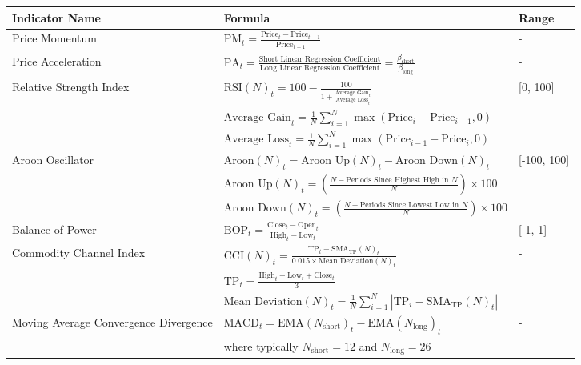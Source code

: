 \begin{table}[htb!]
\centering
\footnotesize
\begin{tabularx}{\textwidth}{@{}lXl@{}}
\toprule
\textbf{Indicator Name} & \textbf{Formula} & \textbf{Range} \\ 
\midrule
Price Momentum & $\text{PM}_t = \frac{\text{Price}_t - \text{Price}_{t-1}}{\text{Price}_{t-1}}$ & - \\
\addlinespace
Price Acceleration & $\text{PA}_t = \frac{\text{Short Linear Regression Coefficient}}{\text{Long Linear Regression Coefficient}} = \frac{\beta_\text{short}}{\beta_\text{long}}$ & - \\
\addlinespace
Relative Strength Index & $\text{RSI}(N)_t = 100 - \frac{100}{1 + \frac{\text{Average Gain}_t}{\text{Average Loss}_t}}$ & [0, 100] \\
\addlinespace
& $\text{Average Gain}_t = \frac{1}{N}\sum_{i=1}^{N} \max(\text{Price}_i - \text{Price}_{i-1}, 0)$ & \\
\addlinespace
& $\text{Average Loss}_t = \frac{1}{N}\sum_{i=1}^{N} \max(\text{Price}_{i-1} - \text{Price}_i, 0)$ & \\
\addlinespace
Aroon Oscillator & $\text{Aroon}(N)_t = \text{Aroon Up}(N)_t - \text{Aroon Down}(N)_t$ & [-100, 100] \\
\addlinespace
& $\text{Aroon Up}(N)_t = \left( \frac{N - \text{Periods Since Highest High in } N}{N} \right) \times 100$ & \\
\addlinespace
& $\text{Aroon Down}(N)_t = \left( \frac{N - \text{Periods Since Lowest Low in } N}{N} \right) \times 100$ & \\
\addlinespace
Balance of Power & $\text{BOP}_t = \frac{\text{Close}_t - \text{Open}_t}{\text{High}_t - \text{Low}_t}$ & [-1, 1] \\
\addlinespace
Commodity Channel Index & $\text{CCI}(N)_t = \frac{\text{TP}_t - \text{SMA}_\text{TP}(N)_t}{0.015 \times \text{Mean Deviation}(N)_t}$ & - \\
\addlinespace
& $\text{TP}_t = \frac{\text{High}_t + \text{Low}_t + \text{Close}_t}{3}$ & \\
\addlinespace
& $\text{Mean Deviation}(N)_t = \frac{1}{N}\sum_{i=1}^{N} |\text{TP}_i - \text{SMA}_\text{TP}(N)_t|$ & \\
\addlinespace
Moving Average Convergence Divergence & $\text{MACD}_t = \text{EMA}(N_{\text{short}})_t - \text{EMA}(N_{\text{long}})_t $ & - \\
\addlinespace
& where typically $N_{\text{short}} = 12$ and $N_{\text{long}} = 26$ & \\

\end{tabularx}
\end{table}
